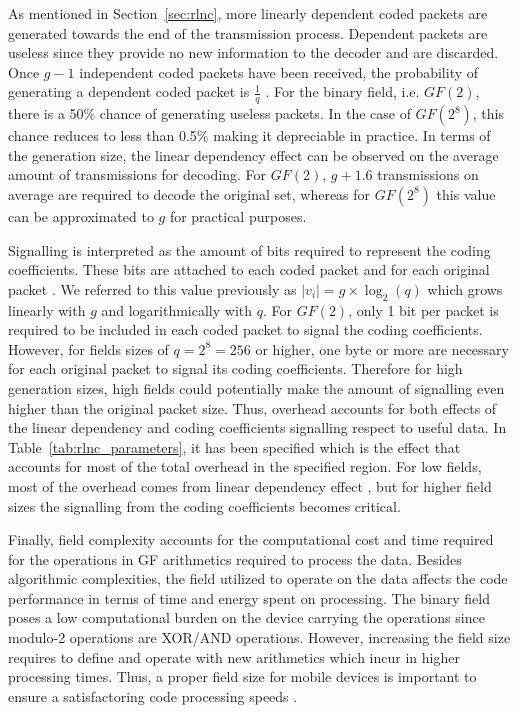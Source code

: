 \label{sec:rlnc}
As mentioned in Section~\ref{sec:rlnc}, more linearly dependent coded packets are generated towards the end of the transmission process. Dependent packets are useless since they provide no new information to the decoder and are discarded. Once $g - 1$ independent coded packets have been received, the probability of generating a dependent coded packet is $\frac{1}{q}$ \cite{lucani2009random,trullols2011exact,zhao2012notes}. For the binary field, i.e. $GF(2)$, there is a 50\% chance of generating useless packets. In the case of $GF(2^8)$, this chance reduces to less than 0.5\% making it depreciable in practice. In terms of the generation size, the linear dependency effect can be observed on the average amount of transmissions for decoding. For $GF(2)$, $g + 1.6$ transmissions on average are required to decode the original set, whereas for $GF(2^8)$ this value can be approximated to $g$ for practical purposes.

Signalling is interpreted as the amount of bits required to represent the coding coefficients. These bits are attached to each coded packet and for each original packet \cite{heide2011code}. We referred to this value previously as $|v_{i}| = g \times \log_{2}(q)$ which grows linearly with $g$ and logarithmically with $q$. For $GF(2)$, only 1 bit per packet is required to be included in each coded packet to signal the coding coefficients. However, for fields sizes of $q = 2^8 = 256$ or higher, one byte or more are necessary for each original packet to signal its coding coefficients. Therefore for high generation sizes, high fields could potentially make the amount of signalling even higher than the original packet size. Thus, overhead accounts for both effects of the linear dependency and coding coefficients signalling respect to useful data. In Table~\ref{tab:rlnc_parameters}, it has been specified which is the effect that accounts for most of the total overhead in the specified region. For low fields, most of the overhead comes from linear dependency effect , but for higher field sizes the signalling from the coding coefficients becomes critical.

Finally, field complexity accounts for the computational cost and time required for the operations in \ac{GF} arithmetics required to process the data. Besides algorithmic complexities, the field utilized to operate on the data affects the code performance in terms of time and energy spent on processing. The binary field poses a low computational burden on the device carrying the operations since modulo-2 operations are XOR/AND operations. However, increasing the field size requires to define and operate with new arithmetics which incur in higher processing times. Thus, a proper field size for mobile devices is important to ensure a satisfactoring code processing speeds \cite{heide2009network,paramanathan2013lean}.

